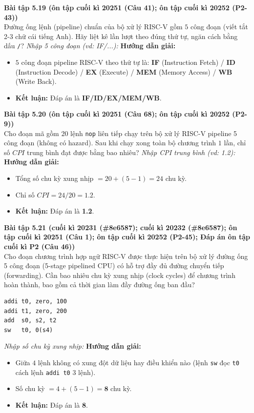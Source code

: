 \textbf{Bài tập 5.19 (ôn tập cuối kì 20251 (Câu 41); ôn tập cuối kì 20252 (P2-43))}\\
Đường ống lệnh (pipeline) chuẩn của bộ xử lý RISC-V gồm $5$ công đoạn (viết tắt 2-3 chữ cái tiếng Anh). Hãy liệt kê lần lượt theo đúng thứ tự, ngăn cách bằng dấu \texttt{/}?
\textit{Nhập 5 công đoạn (vd: IF/...):}
\textbf{Hướng dẫn giải:}
\begin{itemize}
    \item $5$ công đoạn pipeline RISC-V theo thứ tự là: \textbf{IF} (Instruction Fetch) / \textbf{ID} (Instruction Decode) / \textbf{EX} (Execute) / \textbf{MEM} (Memory Access) / \textbf{WB} (Write Back).
    \item \textbf{Kết luận:} Đáp án là \textbf{IF/ID/EX/MEM/WB}.
\end{itemize}

\textbf{Bài tập 5.20 (ôn tập cuối kì 20251 (Câu 68); ôn tập cuối kì 20252 (P2-9))}\\
Cho đoạn mã gồm $20$ lệnh \texttt{nop} liên tiếp chạy trên bộ xử lý RISC-V pipeline 5 công đoạn (không có hazard). Sau khi chạy xong toàn bộ chương trình $1$ lần, chỉ số $CPI$ trung bình đạt được bằng bao nhiêu?
\textit{Nhập CPI trung bình (vd: 1.2):}
\textbf{Hướng dẫn giải:}
\begin{itemize}
    \item Tổng số chu kỳ xung nhịp $= 20 + (5 - 1) = 24$ chu kỳ.
    \item Chỉ số $CPI = 24 / 20 = \mathbf{1.2}$.
    \item \textbf{Kết luận:} Đáp án là \textbf{1.2}.
\end{itemize}

\textbf{Bài tập 5.21 (cuối kì 20231 (\#8e6587); cuối kì 20232 (\#8e6587); ôn tập cuối kì 20251 (Câu 1); ôn tập cuối kì 20252 (P2-45); Đáp án ôn tập cuối kì P2 (Câu 46))}\\
Cho đoạn chương trình hợp ngữ RISC-V được thực hiện trên bộ xử lý đường ống 5 công đoạn (5-stage pipelined CPU) có hỗ trợ đầy đủ đường chuyển tiếp (forwarding). Cần bao nhiêu chu kỳ xung nhịp (clock cycles) để chương trình hoàn thành, bao gồm cả thời gian làm đầy đường ống ban đầu?
\begin{lstlisting}
addi t0, zero, 100
addi t1, zero, 200
add  s0, s2, t2
sw   t0, 0(s4)
\end{lstlisting}
\textit{Nhập số chu kỳ xung nhịp:}
\textbf{Hướng dẫn giải:}
\begin{itemize}
    \item Giữa $4$ lệnh không có xung đột dữ liệu hay điều khiển nào (lệnh \texttt{sw} đọc \texttt{t0} cách lệnh \texttt{addi t0} 3 lệnh).
    \item Số chu kỳ $= 4 + (5 - 1) = \mathbf{8}$ chu kỳ.
    \item \textbf{Kết luận:} Đáp án là \textbf{8}.
\end{itemize}

